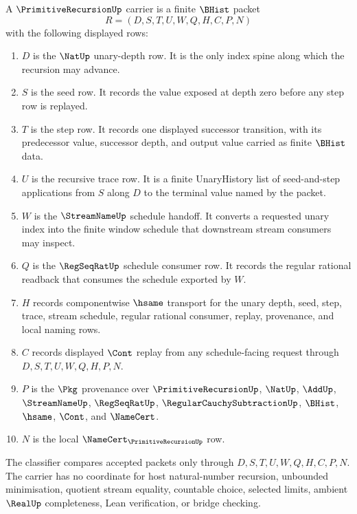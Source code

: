 \begin{definition}
\label{def:primitive-recursion-carrier}
A $\PrimitiveRecursionUp$ carrier is a finite $\BHist$ packet
$$
R=(D,S,T,U,W,Q,H,C,P,N)
$$
with the following displayed rows:
\begin{enumerate}
\item $D$ is the $\NatUp$ unary-depth row. It is the only index spine along which the recursion may advance.
\item $S$ is the seed row. It records the value exposed at depth zero before any step row is replayed.
\item $T$ is the step row. It records one displayed successor transition, with its predecessor value, successor depth, and output value carried as finite $\BHist$ data.
\item $U$ is the recursive trace row. It is a finite UnaryHistory list of seed-and-step applications from $S$ along $D$ to the terminal value named by the packet.
\item $W$ is the $\StreamNameUp$ schedule handoff. It converts a requested unary index into the finite window schedule that downstream stream consumers may inspect.
\item $Q$ is the $\RegSeqRatUp$ schedule consumer row. It records the regular rational readback that consumes the schedule exported by $W$.
\item $H$ records componentwise $\hsame$ transport for the unary depth, seed, step, trace, stream schedule, regular rational consumer, replay, provenance, and local naming rows.
\item $C$ records displayed $\Cont$ replay from any schedule-facing request through $D,S,T,U,W,Q,H,P,N$.
\item $P$ is the $\Pkg$ provenance over $\PrimitiveRecursionUp$, $\NatUp$, $\AddUp$, $\StreamNameUp$, $\RegSeqRatUp$, $\RegularCauchySubtractionUp$, $\BHist$, $\hsame$, $\Cont$, and $\NameCert$.
\item $N$ is the local $\NameCert_{\PrimitiveRecursionUp}$ row.
\end{enumerate}
The classifier compares accepted packets only through $D,S,T,U,W,Q,H,C,P,N$. The carrier has no coordinate for host natural-number recursion, unbounded minimisation, quotient stream equality, countable choice, selected limits, ambient $\RealUp$ completeness, Lean verification, or bridge checking.
\end{definition}

